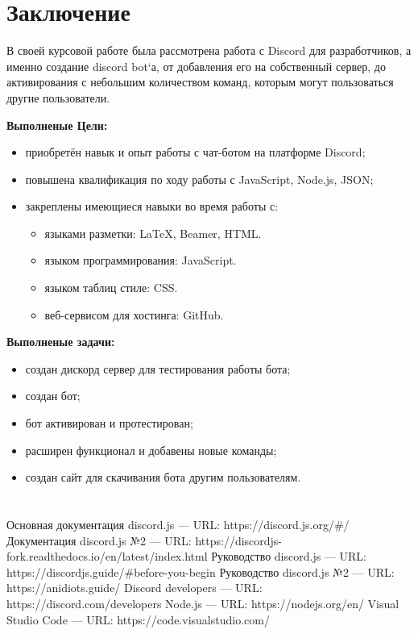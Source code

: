 \documentclass[a4paper,12pt]{article}
\begin{document}
\newpage
\section{Заключение}
\Large
В своей курсовой работе была рассмотрена работа с Discord для разработчиков, а именно создание discord bot`а, от добавления его на собственный сервер, до активирования с небольшим количеством команд, которым могут пользоваться другие пользователи.

\textbf{Выполненые Цели:}
\begin{itemize}
    \item[\Checkmark] приобретён навык и опыт работы с чат-ботом на платформе Discord;
    \item[\Checkmark] повышена квалификация по ходу работы с JavaScript, Node.js, JSON;
    \item[\Checkmark] закреплены имеющиеся навыки во время работы с:
    \begin{itemize}
    \item языками разметки: LaTeX, Beamer, HTML.
    \item языком программирования: JavaScript.
    \item языком таблиц стиле: CSS.
    \item веб-сервисом для хостинга: GitHub.
    \end{itemize}
\end{itemize}

\textbf{Выполненые задачи:} 
\begin{itemize}
    \item[\Checkmark] создан дискорд сервер для тестирования работы бота;
    \item[\Checkmark] создан бот;
    \item[\Checkmark] бот активирован и протестирован; 
    \item[\Checkmark] расширен функционал и добавены новые команды;
    \item[\Checkmark] создан сайт для скачивания бота другим пользователям.
\end{itemize}

\newpage
\large
\section{\label{ll}}
\begin{thebibliography}{100}

 Основная документация discord.js — URL: https://discord.js.org/#/
 Документация discord.js №2 — URL: https://discordjs-fork.readthedocs.io/en/latest/index.html
 Руководство discord.js — URL: https://discordjs.guide/#before-you-begin
 Руководство discord.js №2 — URL: https://anidiots.guide/
 Discord developers — URL: https://discord.com/developers
 Node.js — URL: https://nodejs.org/en/
 Visual Studio Code — URL: https://code.visualstudio.com/
\end{thebibliography}

\end{document}
